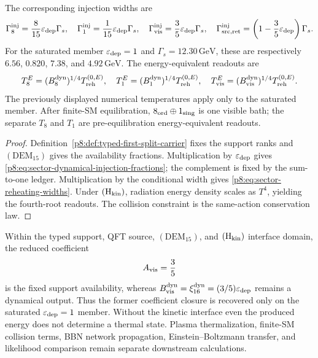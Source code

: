 \documentclass[12pt,a4paper]{article}
\begin{document}
\begin{theorem}
The corresponding injection widths are
\begin{equation}
\label{p8:eq:sector-reheating-widths}
\Gamma_8^{\rm inj}=\frac8{15}\varepsilon_{\rm dep}\Gamma_s,
\quad
\Gamma_1^{\rm inj}=\frac1{15}\varepsilon_{\rm dep}\Gamma_s,
\quad
\Gamma_{\rm vis}^{\rm inj}=\frac35\varepsilon_{\rm dep}\Gamma_s,
\quad
\Gamma_{\rm src,ret}^{\rm inj}
=\left(1-\frac35\varepsilon_{\rm dep}\right)\Gamma_s.
\end{equation}
For the saturated member \(\varepsilon_{\rm dep}=1\) and
\(\Gamma_s=12.30\,\mathrm{GeV}\), these are respectively
\(6.56\), \(0.820\), \(7.38\), and \(4.92\,\mathrm{GeV}\).
The energy-equivalent readouts are
\begin{equation}
\label{p8:eq:sector-reheating-temperatures}
T_8^{E}=(B_8^{\rm dyn})^{1/4}T_{\rm reh}^{(0,E)},
\quad
T_1^{E}=(B_1^{\rm dyn})^{1/4}T_{\rm reh}^{(0,E)},
\quad
T_{\rm vis}^{E}=(B_{\rm vis}^{\rm dyn})^{1/4}T_{\rm reh}^{(0,E)}.
\end{equation}
The previously displayed numerical temperatures apply only to the saturated
member.  After finite-SM equilibration,
\(8_{\rm ord}\oplus1_{\rm sing}\) is one visible bath; the separate
\(T_8\) and \(T_1\) are pre-equilibration energy-equivalent readouts.
\end{theorem}

\begin{proof}
Definition~\ref{p8:def:typed-first-split-carrier} fixes the support ranks and
\((\mathrm{DEM}_{15})\) gives the availability fractions.  Multiplication by
\(\varepsilon_{\rm dep}\) gives
\eqref{p8:eq:sector-dynamical-injection-fractions}; the complement is fixed by
the sum-to-one ledger.  Multiplication by the conditional width gives
\eqref{p8:eq:sector-reheating-widths}.  Under \((\mathrm H_{\rm kin})\),
radiation energy density scales as \(T^4\), yielding the fourth-root
readouts.  The collision constraint is the same-action conservation law.
\end{proof}


\begin{corollary}
\label{p8:cor:first-split-reduced-closure-status}
Within the typed support, QFT source, \((\mathrm{DEM}_{15})\), and
\((\mathrm H_{\rm kin})\) interface domain, the reduced coefficient
\[
A_{\rm vis}=\frac35
\]
is the fixed support availability, whereas
\(B_{\rm vis}^{\rm dyn}=\xi_{16}^{\rm dyn}
=(3/5)\varepsilon_{\rm dep}\) remains a dynamical output.  Thus the former
coefficient closure is recovered only on the saturated
\(\varepsilon_{\rm dep}=1\) member.  Without the kinetic interface even the
produced energy does not determine a thermal state.  Plasma
thermalization, finite-SM collision terms, BBN network propagation,
Einstein--Boltzmann transfer, and likelihood comparison remain separate
downstream calculations.
\end{corollary}
\end{document}
